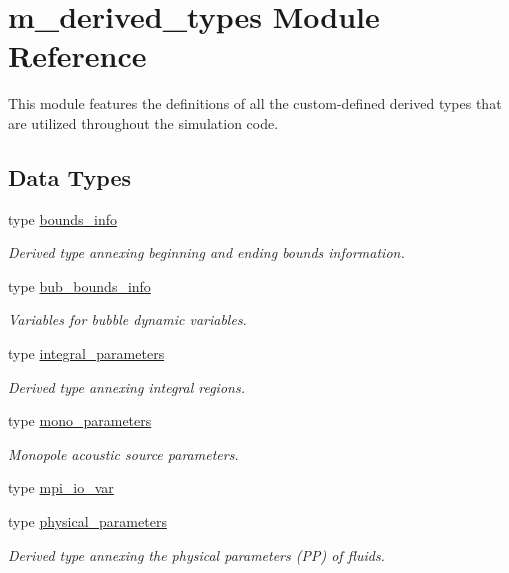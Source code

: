 \hypertarget{namespacem__derived__types}{}\section{m\+\_\+derived\+\_\+types Module Reference}
\label{namespacem__derived__types}


This module features the definitions of all the custom-\/defined derived types that are utilized throughout the simulation code.  


\subsection*{Data Types}
\begin{DoxyCompactItemize}
\item 
type \hyperlink{structm__derived__types_1_1bounds__info}{bounds\+\_\+info}
\begin{DoxyCompactList}\small\item\em Derived type annexing beginning and ending bounds information. \end{DoxyCompactList}\item 
type \hyperlink{structm__derived__types_1_1bub__bounds__info}{bub\+\_\+bounds\+\_\+info}
\begin{DoxyCompactList}\small\item\em Variables for bubble dynamic variables. \end{DoxyCompactList}\item 
type \hyperlink{structm__derived__types_1_1integral__parameters}{integral\+\_\+parameters}
\begin{DoxyCompactList}\small\item\em Derived type annexing integral regions. \end{DoxyCompactList}\item 
type \hyperlink{structm__derived__types_1_1mono__parameters}{mono\+\_\+parameters}
\begin{DoxyCompactList}\small\item\em Monopole acoustic source parameters. \end{DoxyCompactList}\item 
type \hyperlink{structm__derived__types_1_1mpi__io__var}{mpi\+\_\+io\+\_\+var}
\item 
type \hyperlink{structm__derived__types_1_1physical__parameters}{physical\+\_\+parameters}
\begin{DoxyCompactList}\small\item\em Derived type annexing the physical parameters (PP) of fluids. \end{DoxyCompactList}\item 

\end{DoxyCompactItemize}
